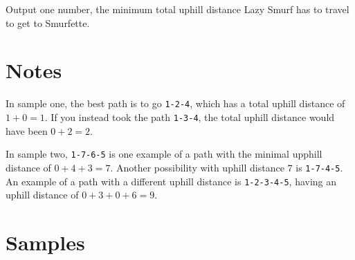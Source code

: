 Output one number, the minimum total uphill distance Lazy Smurf has to
travel to get to Smurfette.

\section*{Notes}

In sample one, the best path is to go \texttt{1-2-4}, which has a total uphill distance of $1+0=1$.
If you instead took the path \texttt{1-3-4}, the total uphill distance would have been $0+2=2$.

In sample two, \texttt{1-7-6-5} is one example of a path with the minimal upphill distance of $0+4+3=7$.
Another possibility with uphill distance $7$ is \texttt{1-7-4-5}. An example of a path with a different uphill distance is
\texttt{1-2-3-4-5}, having an uphill distance of $0+3+0+6 = 9$.

\section*{Samples}
